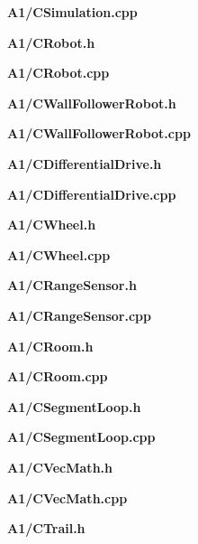 \documentclass[10pt]{article}
\begin{document}
\noindent\textbf{\ttfamily\small A1/CSimulation.cpp}


\noindent\textbf{\ttfamily\small A1/CRobot.h}


\noindent\textbf{\ttfamily\small A1/CRobot.cpp}


\noindent\textbf{\ttfamily\small A1/CWallFollowerRobot.h}


\noindent\textbf{\ttfamily\small A1/CWallFollowerRobot.cpp}


\noindent\textbf{\ttfamily\small A1/CDifferentialDrive.h}


\noindent\textbf{\ttfamily\small A1/CDifferentialDrive.cpp}


\noindent\textbf{\ttfamily\small A1/CWheel.h}


\noindent\textbf{\ttfamily\small A1/CWheel.cpp}


\noindent\textbf{\ttfamily\small A1/CRangeSensor.h}


\noindent\textbf{\ttfamily\small A1/CRangeSensor.cpp}


\noindent\textbf{\ttfamily\small A1/CRoom.h}


\noindent\textbf{\ttfamily\small A1/CRoom.cpp}


\noindent\textbf{\ttfamily\small A1/CSegmentLoop.h}


\noindent\textbf{\ttfamily\small A1/CSegmentLoop.cpp}


\noindent\textbf{\ttfamily\small A1/CVecMath.h}


\noindent\textbf{\ttfamily\small A1/CVecMath.cpp}


\noindent\textbf{\ttfamily\small A1/CTrail.h}

\end{document}
